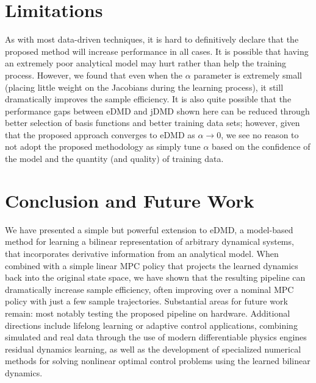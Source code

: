 \documentclass{article}
\begin{document}
\section{Limitations} \label{sec:limitations}
As with most data-driven techniques, it is hard to definitively declare that the proposed 
method will increase performance in all cases. It is possible that having an extremely poor
analytical model may hurt rather than help the training process. However, we found that even
when the $\alpha$ parameter is extremely small (placing little weight on the Jacobians 
during the learning process), it still dramatically improves the sample efficiency. It is 
also quite possible that the performance gaps between eDMD and jDMD shown here can be 
reduced through better selection of basis functions and better training data sets; however,
given that the proposed approach converges to eDMD as $\alpha \rightarrow 0$, we see no 
reason to not adopt the proposed methodology as simply tune $\alpha$ based on the 
confidence of the model and the quantity (and quality) of training data.


\section{Conclusion and Future Work} \label{sec:conclusion}

We have presented a simple but powerful extension to eDMD, a model-based method for learning
a bilinear representation of arbitrary dynamical systems, that incorporates derivative
information from an analytical model. When combined with a simple linear MPC policy that
projects the learned dynamics back into the original state space, we have shown that the
resulting pipeline can dramatically increase sample efficiency, often improving over a
nominal MPC policy with just a few sample trajectories. Substantial areas for future work
remain: most notably testing the proposed pipeline on hardware. Additional directions
include lifelong learning or adaptive control applications, combining simulated and real
data through the use of modern differentiable physics engines \cite{Howell2022,Todorov2012}
residual dynamics learning, as well as the development of specialized numerical methods for
solving nonlinear optimal control problems using the learned bilinear dynamics.


\end{document}
